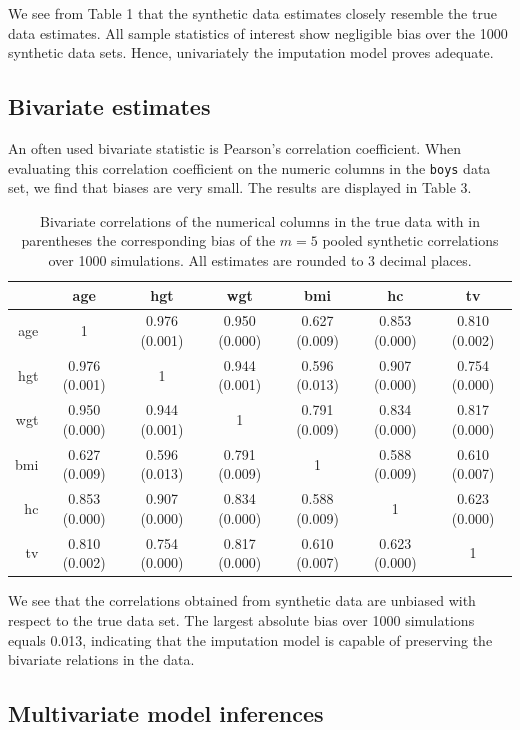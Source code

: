 \documentclass[psych,article,submit,moreauthors,pdftex]{mdpi}
\begin{document}
We see from Table 1 that the synthetic data estimates closely resemble
the true data estimates. All sample statistics of interest show
negligible bias over the 1000 synthetic data sets. Hence, univariately
the imputation model proves adequate.

\hypertarget{bivariate-estimates}{%
\subsection{Bivariate estimates}\label{bivariate-estimates}}

An often used bivariate statistic is Pearson's correlation coefficient.
When evaluating this correlation coefficient on the numeric columns in
the \texttt{boys} data set, we find that biases are very small. The
results are displayed in Table 3.

\begin{table}[H]
\caption{Bivariate correlations of the numerical columns in the true data with in parentheses the corresponding bias of the $m=5$ pooled synthetic correlations over 1000 simulations. All estimates are rounded to 3 decimal places. }
\centering
\begin{tabular}{rcccccc}
  \hline
 & age & hgt & wgt & bmi & hc & tv \\ 
  \hline
age & 1 & 0.976 (0.001) & 0.950 (0.000) & 0.627 (0.009) & 0.853 (0.000) & 0.810 (0.002) \\ 
  hgt & 0.976 (0.001) & 1 & 0.944 (0.001) & 0.596 (0.013) & 0.907 (0.000) & 0.754 (0.000) \\ 
  wgt & 0.950 (0.000) & 0.944 (0.001) & 1 & 0.791 (0.009) & 0.834 (0.000) & 0.817 (0.000) \\ 
  bmi & 0.627 (0.009) & 0.596 (0.013) & 0.791 (0.009) & 1 & 0.588 (0.009) & 0.610 (0.007) \\ 
  hc & 0.853 (0.000) & 0.907 (0.000) & 0.834 (0.000) & 0.588 (0.009) & 1 & 0.623 (0.000) \\ 
  tv & 0.810 (0.002) & 0.754 (0.000) & 0.817 (0.000) & 0.610 (0.007) & 0.623 (0.000) & 1 \\ 
   \hline
\end{tabular}
\end{table}

We see that the correlations obtained from synthetic data are unbiased
with respect to the true data set. The largest absolute bias over 1000
simulations equals 0.013, indicating that the imputation model is
capable of preserving the bivariate relations in the data.

\hypertarget{multivariate-model-inferences}{%
\subsection{Multivariate model
inferences}\label{multivariate-model-inferences}}
\end{document}
